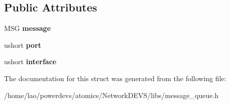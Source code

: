 \subsection*{Public Attributes}
\begin{DoxyCompactItemize}
\item 
M\+SG {\bfseries message}\hypertarget{structmessage_1_1Message_aeb66a0d0a4dc67b503a734d7ef25aa1f}{}\label{structmessage_1_1Message_aeb66a0d0a4dc67b503a734d7ef25aa1f}

\item 
ushort {\bfseries port}\hypertarget{structmessage_1_1Message_ad59937905e4503cd435d697793a03e5e}{}\label{structmessage_1_1Message_ad59937905e4503cd435d697793a03e5e}

\item 
ushort {\bfseries interface}\hypertarget{structmessage_1_1Message_a0a3cb8150f36a284effabca7a6b0bc5c}{}\label{structmessage_1_1Message_a0a3cb8150f36a284effabca7a6b0bc5c}

\end{DoxyCompactItemize}


The documentation for this struct was generated from the following file\+:\begin{DoxyCompactItemize}
\item 
/home/lao/powerdevs/atomics/\+Network\+D\+E\+V\+S/libs/message\+\_\+queue.\+h\end{DoxyCompactItemize}
